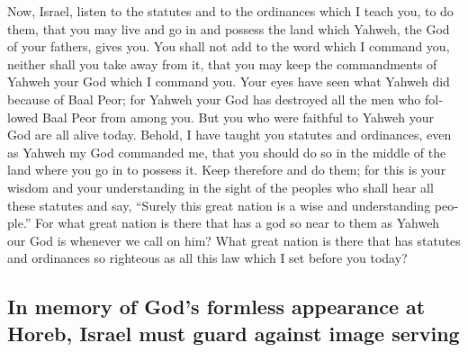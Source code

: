 \begin{paracol}{2}
\begin{otherlanguage}{english}
 Now, Israel, listen to the statutes and to the ordinances
which I teach you, to do them, that you may live and go in and possess
the land which Yahweh, the God of your fathers, gives you.
 You shall not add to the word which I command you,
neither shall you take away from it, that you may keep the commandments
of Yahweh your God which I command you.  Your eyes have
seen what Yahweh did because of Baal Peor; for Yahweh your God has
destroyed all the men who followed Baal Peor from among you.
 But you who were faithful to Yahweh your God are all
alive today.  Behold, I have taught you statutes and
ordinances, even as Yahweh my God commanded me, that you should do so in
the middle of the land where you go in to possess it. 
Keep therefore and do them; for this is your wisdom and your
understanding in the sight of the peoples who shall hear all these
statutes and say, ``Surely this great nation is a wise and understanding
people.''  For what great nation is there that has a god
so near to them as Yahweh our God is whenever we call on him?
 What great nation is there that has statutes and
ordinances so righteous as all this law which I set before you today?

\hypertarget{in-memory-of-gods-formless-appearance-at-horeb-israel-must-guard-against-image-serving}{%
\subsection{In memory of God's formless appearance at Horeb, Israel must
guard against image
serving}\label{in-memory-of-gods-formless-appearance-at-horeb-israel-must-guard-against-image-serving}}


\end{otherlanguage}
\end{paracol}
